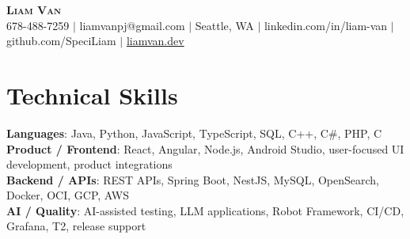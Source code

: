 \documentclass[letterpaper,11pt]{article}
\begin{document}

%
\begin{center}
    \textbf{\Huge \scshape Liam Van} \\ \vspace{1pt}
    \small 678-488-7259 $|$ \small {liamvanpj@gmail.com} $|$ Seattle, WA
 {{$|$ linkedin.com/in/liam-van} {$|$ github.com/SpeciLiam} {$|$ \href{https://liamvan.dev}{liamvan.dev}}}

\end{center}

\section{Technical Skills}
 \begin{itemize}[leftmargin=0.15in, label={}]
    \small{\item{
     \textbf{Languages}{: Java, Python, JavaScript, TypeScript, SQL, C++, C\#, PHP, C} \\
     \textbf{Product / Frontend}{: React, Angular, Node.js, Android Studio, user-focused UI development, product integrations} \\
     \textbf{Backend / APIs}{: REST APIs, Spring Boot, NestJS, MySQL, OpenSearch, Docker, OCI, GCP, AWS} \\
     \textbf{AI / Quality}{: AI-assisted testing, LLM applications, Robot Framework, CI/CD, Grafana, T2, release support} \\
    }}
 \end{itemize}
%

\end{document}
